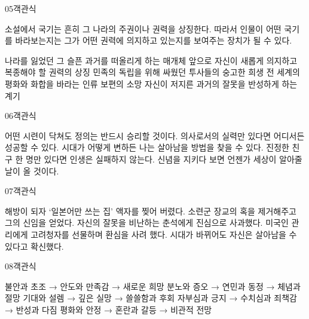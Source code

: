 \documentclass[fs9,seriesRus]{korfarm-base}
\begin{document}
\begin{kfQBlock}{05}{객관식}
\begin{kfEvidence}소설에서 국기는 흔히 그 나라의 주권이나 권력을 상징한다. 따라서 인물이 어떤 국기를 바라보는지는 그가 어떤 권력에 의지하고 있는지를 보여주는 장치가 될 수 있다.\end{kfEvidence}
\begin{kfChoices}
\kfChoice 나라를 잃었던 그 슬픈 과거를 떠올리게 하는 매개체
\kfChoice 앞으로 자신이 새롭게 의지하고 복종해야 할 권력의 상징
\kfChoice 민족의 독립을 위해 싸웠던 투사들의 숭고한 희생
\kfChoice 전 세계의 평화와 화합을 바라는 인류 보편의 소망
\kfChoice 자신이 저지른 과거의 잘못을 반성하게 하는 계기
\end{kfChoices}
\end{kfQBlock}
\begin{kfQBlock}{06}{객관식}
\begin{kfChoices}
\kfChoice 어떤 시련이 닥쳐도 정의는 반드시 승리할 것이다.
\kfChoice 의사로서의 실력만 있다면 어디서든 성공할 수 있다.
\kfChoice 시대가 어떻게 변하든 나는 살아남을 방법을 찾을 수 있다.
\kfChoice 진정한 친구 한 명만 있다면 인생은 실패하지 않는다.
\kfChoice 신념을 지키다 보면 언젠가 세상이 알아줄 날이 올 것이다.
\end{kfChoices}
\end{kfQBlock}
\begin{kfQBlock}{07}{객관식}
\begin{kfChoices}
\kfChoice 해방이 되자 ‘일본어만 쓰는 집’ 액자를 찢어 버렸다.
\kfChoice 소련군 장교의 혹을 제거해주고 그의 신임을 얻었다.
\kfChoice 자신의 잘못을 비난하는 춘석에게 진심으로 사과했다.
\kfChoice 미국인 관리에게 고려청자를 선물하며 환심을 사려 했다.
\kfChoice 시대가 바뀌어도 자신은 살아남을 수 있다고 확신했다.
\end{kfChoices}
\end{kfQBlock}
\begin{kfQBlock}{08}{객관식}
\begin{kfChoices}
\kfChoice 불안과 초조 → 안도와 만족감 → 새로운 희망
\kfChoice 분노와 증오 → 연민과 동정 → 체념과 절망
\kfChoice 기대와 설렘 → 깊은 실망 → 쓸쓸함과 후회
\kfChoice 자부심과 긍지 → 수치심과 죄책감 → 반성과 다짐
\kfChoice 평화와 안정 → 혼란과 갈등 → 비관적 전망
\end{kfChoices}
\end{kfQBlock}
\end{document}
